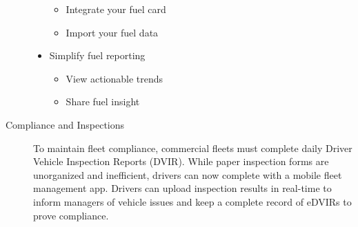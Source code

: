 \begin{description}
\begin{itemize}
    \begin{itemize}
         \item	Integrate your fuel card
        \item	Import your fuel data
    \end{itemize}
    \item	Simplify fuel reporting
        \begin{itemize}
            \item	View actionable trends
            \item	Share fuel insight
        \end{itemize}
    \end{itemize}
    \item [Compliance and Inspections] To maintain fleet compliance, commercial fleets must complete daily Driver Vehicle Inspection Reports (DVIR). While paper inspection forms are unorganized and inefficient, drivers can now complete with a mobile fleet management app. Drivers can upload inspection results in real-time to inform managers of vehicle issues and keep a complete record of eDVIRs to prove compliance.
\end{description}

